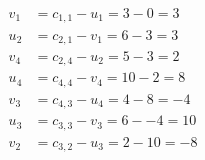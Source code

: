 \[
\begin{aligned}
v_{1} &= c_{1,1} - u_{1} = 3 - 0 = 3 \\
u_{2} &= c_{2,1} - v_{1} = 6 - 3 = 3 \\
v_{4} &= c_{2,4} - u_{2} = 5 - 3 = 2 \\
u_{4} &= c_{4,4} - v_{4} = 10 - 2 = 8 \\
v_{3} &= c_{4,3} - u_{4} = 4 - 8 = -4 \\
u_{3} &= c_{3,3} - v_{3} = 6 - -4 = 10 \\
v_{2} &= c_{3,2} - u_{3} = 2 - 10 = -8 \\
\end{aligned}
\]

